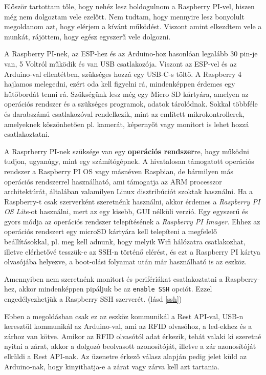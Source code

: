 \documentclass[
]{thesis-ekf}
\theoremstyle{definition}
\theoremstyle{remark}
\begin{document}
Először tartottam tőle, hogy nehéz lesz boldogulnom a Raspberry PI-vel, hiszen még nem dolgoztam vele ezelőtt. Nem tudtam, hogy mennyire lesz bonyolult megoldanom azt, hogy elérjem a kívánt működést. Viszont amint elkezdtem vele a munkát, rájöttem, hogy egész egyszerű vele dolgozni.

A Raspberry PI-nek, az ESP-hez és az Arduino-hoz hasonlóan legalább 30 pin-je van, 5 Voltról működik és van USB csatlakozója. Viszont az ESP-vel és az Arduino-val ellentétben, szükséges hozzá egy USB-C-s töltő. A Raspberry 4 hajlamos melegedni, ezért oda kell figyelni rá, mindenképpen érdemes egy hűtőbordát tenni rá. Szükségünk lesz még egy Micro SD kártyára, amelyen az operációs rendszer és a szükséges programok, adatok tárolódnak. Sokkal többféle és darabszámú csatlakozóval rendelkezik, mint az említett mikrokontrollerek, amelyeknek köszönhetően pl. kamerát, képernyőt vagy monitort is lehet hozzá csatlakoztatni.

A Rasprberry PI-nek szüksége van egy \textbf{operációs rendszer}re, hogy működni tudjon, ugyanúgy, mint egy számítógépnek. A hivatalosan támogatott operációs rendszer a Raspberry PI OS vagy másnéven Raspbian, de bármilyen más operációs rendszerrel használható, ami támogatja az ARM processzor architektúrát, általában valamilyen Linux disztribúciót szoktak használni. Ha a Raspberry-t csak szerverként szeretnénk használni, akkor érdemes a \emph{Raspberry PI OS Lite}-ot használni, mert az egy kisebb, GUI nélküli verzió. Egy egyszerű és gyors módja az operációs rendszer telepítésének a \emph{Raspberry PI Imager}. Ehhez az operációs rendszert egy microSD kártyára kell telepíteni a megfelelő beállításokkal, pl. meg kell adnunk, hogy melyik Wifi hálózatra csatlakozhat, illetve elérhetővé tesszük-e az SSH-n történő elérést, és ezt a Raspberry PI kártya olvasójába helyezve, a boot-olási folyamat után már használható is az eszköz.\cite{raspberry-os}

Amennyiben nem szeretnénk monitort és perifériákat csatlakoztatni a Raspberry-hez, akkor mindenképpen pipáljuk be az \texttt{enable SSH} opciót. Ezzel engedélyezhetjük a Raspberry SSH szerverét. (lásd \ref{ssh})

Ebben a megoldásban csak ez az eszköz kommunikál a Rest API-val, USB-n keresztül kommunikál az Arduino-val, ami az RFID olvasóhoz, a led-ekhez és a zárhoz van kötve. Amikor az RFID olvasótól adat érkezik, tehát valaki ki szeretné nyitni a zárat, akkor a dolgozó beolvasott azonosítóját, illetve a zár azonosítóját elküldi a Rest API-nak. Az üzenetre érkező válasz alapján pedig jelet küld az Arduino-nak, hogy kinyithatja-e a zárat vagy zárva kell azt tartania.
\end{document}
